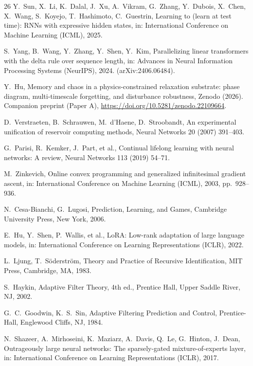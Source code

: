 \documentclass[preprint,12pt]{elsarticle}
\begin{document}
\begin{thebibliography}{26}
Y.~Sun, X.~Li, K.~Dalal, J.~Xu, A.~Vikram, G.~Zhang, Y.~Dubois,
X.~Chen, X.~Wang, S.~Koyejo, T.~Hashimoto, C.~Guestrin, Learning to
(learn at test time): RNNs with expressive hidden states, in:
International Conference on Machine Learning (ICML), 2025.

S.~Yang, B.~Wang, Y.~Zhang, Y.~Shen, Y.~Kim, Parallelizing linear
transformers with the delta rule over sequence length, in: Advances in
Neural Information Processing Systems (NeurIPS), 2024.
(arXiv:2406.06484).

Y.~Hu, Memory and chaos in a physics-constrained relaxation substrate:
phase diagram, multi-timescale forgetting, and disturbance robustness,
Zenodo (2026). Companion preprint (Paper A),
\url{https://doi.org/10.5281/zenodo.22109664}.

D.~Verstraeten, B.~Schrauwen, M.~d'Haene, D.~Stroobandt, An
experimental unification of reservoir computing methods, Neural
Networks 20 (2007) 391--403.

G.~Parisi, R.~Kemker, J.~Part, et al., Continual lifelong learning with
neural networks: A review, Neural Networks 113 (2019) 54--71.

M.~Zinkevich, Online convex programming and generalized infinitesimal
gradient ascent, in: International Conference on Machine Learning
(ICML), 2003, pp.~928--936.

N.~Cesa-Bianchi, G.~Lugosi, Prediction, Learning, and Games, Cambridge
University Press, New York, 2006.

E.~Hu, Y.~Shen, P.~Wallis, et al., LoRA: Low-rank adaptation of large
language models, in: International Conference on Learning
Representations (ICLR), 2022.

L.~Ljung, T.~S\"oderstr\"om, Theory and Practice of Recursive
Identification, MIT Press, Cambridge, MA, 1983.

S.~Haykin, Adaptive Filter Theory, 4th ed., Prentice Hall, Upper
Saddle River, NJ, 2002.

G.~C.~Goodwin, K.~S.~Sin, Adaptive Filtering Prediction and Control,
Prentice-Hall, Englewood Cliffs, NJ, 1984.

N.~Shazeer, A.~Mirhoseini, K.~Maziarz, A.~Davis, Q.~Le, G.~Hinton,
J.~Dean, Outrageously large neural networks: The sparsely-gated
mixture-of-experts layer, in: International Conference on Learning
Representations (ICLR), 2017.


\end{thebibliography}
\end{document}
